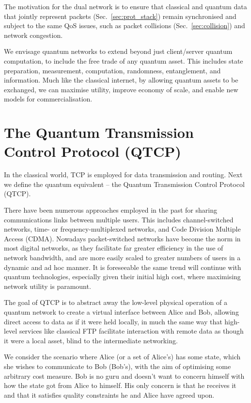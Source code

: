 \documentclass[aps,rmp,twocolumn,amsmath,amssymb,nofootinbib,superscriptaddress]{revtex4}
\begin{document}
The motivation for the dual network is to ensure that classical and quantum data that jointly represent packets (Sec.~\ref{sec:prot_stack}) remain synchronised and subject to the same QoS issues, such as packet collisions (Sec.~\ref{sec:collision}) and network congestion.

We envisage quantum networks to extend beyond just client/server quantum computation, to include the free trade of any quantum asset. This includes state preparation, measurement, computation, randomness, entanglement, and information. Much like the classical internet, by allowing quantum assets to be exchanged, we can maximise utility, improve economy of scale, and enable new models for commercialisation.

%
%

\section{The Quantum Transmission Control Protocol (QTCP)}

In the classical world, TCP is employed for data transmission and routing. Next we define the quantum equivalent -- the Quantum Transmission Control Protocol (QTCP).

There have been numerous approaches employed in the past for sharing communications links between multiple users. This includes channel-switched networks, time- or frequency-multiplexed networks, and Code Division Multiple Access (CDMA). Nowadays packet-switched networks have become the norm in most digital networks, as they facilitate far greater efficiency in the use of network bandwidth, and are more easily scaled to greater numbers of users in a dynamic and ad hoc manner. It is foreseeable the same trend will continue with quantum technologies, especially given their initial high cost, where maximising network utility is paramount.

The goal of QTCP is to abstract away the low-level physical operation of a quantum network to create a virtual interface between Alice and Bob, allowing direct access to data as if it were held locally, in much the same way that high-level services like classical FTP facilitate interaction with remote data as though it were a local asset, blind to the intermediate networking.

We consider the scenario where Alice (or a set of Alice's) has some state, which she wishes to communicate to Bob (Bob's), with the aim of optimising some arbitrary cost measure. Bob is no guru and doesn't want to concern himself with how the state got from Alice to himself. His only concern is that he receives it and that it satisfies quality constraints he and Alice have agreed upon.
\end{document}
